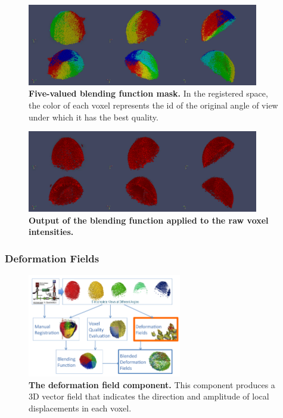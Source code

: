 \begin{figure}
\begin{center}
\includegraphics[width=0.9\textwidth]{../../images/Reconstruction/washington/blendingfunction.png}
\end{center}
\caption{\textbf{Five-valued blending function mask.} In the registered space, the color of each voxel represents the id of the original angle of view under which it has the best quality. }
\label{washington_blendingfunction}
\end{figure}
\begin{figure}
\begin{center}
\includegraphics[width=0.9\textwidth]{../../images/Reconstruction/washington/blendingfunction_raw.png}
\end{center}
\caption{\textbf{Output of the blending function applied to the raw voxel intensities.}}
\label{washington_blendingfunction_raw}
\end{figure}

\subsubsection{Deformation Fields  }
\begin{figure}
\begin{center}
\includegraphics[width=0.6\textwidth]{../../images/Reconstruction/washington/workflow_deffield_corrected.png}
\end{center}
\caption{\textbf{The deformation field component.} This component produces a 3D vector field that indicates the direction and amplitude of local displacements in each voxel.}
\label{washington_workflow_deffield}
\end{figure}


